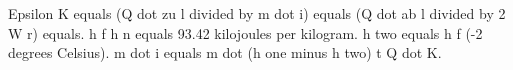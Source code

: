 Epsilon K equals (Q dot zu l divided by m dot i) equals (Q dot ab l divided by 2 W r) equals. h f h n equals 93.42 kilojoules per kilogram. h two equals h f (-2 degrees Celsius). m dot i equals m dot (h one minus h two) t Q dot K.